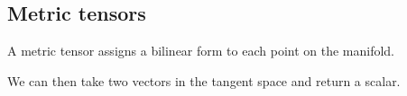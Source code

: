 
\subsection{Metric tensors}

A metric tensor assigns a bilinear form to each point on the manifold.

We can then take two vectors in the tangent space and return a scalar.

